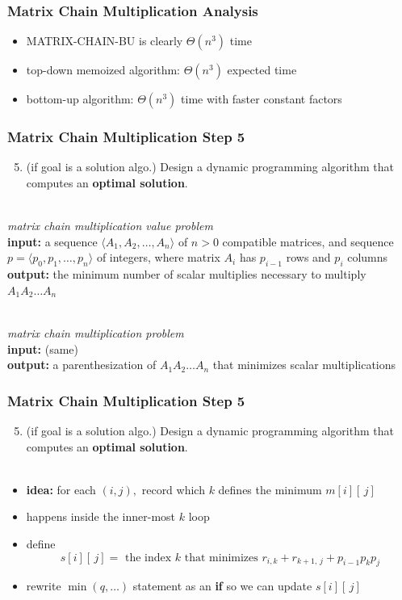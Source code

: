 \documentclass{beamer}
\newcommand{\stanza}{ \\~\ }
\begin{document}
\begin{frame} \frametitle{Matrix Chain Multiplication Analysis}
  \begin{itemize}
    \item MATRIX-CHAIN-BU is clearly $\Theta(n^3)$ time
    \item top-down memoized algorithm: $\Theta(n^3)$ expected time
    \item bottom-up algorithm: $\Theta(n^3)$ time with faster constant factors
  \end{itemize}
\end{frame}

\begin{frame} \frametitle{Matrix Chain Multiplication Step 5}
  \begin{enumerate}
    \setcounter{enumi}{4}
    \item (if goal is a solution algo.) Design a dynamic programming algorithm that computes an \textbf{optimal solution}.
    \stanza
  \end{enumerate}

  \emph{matrix chain multiplication value problem} \\
  \textbf{input:} a sequence $\langle A_1, A_2, \ldots, A_n \rangle$ of $n>0$ compatible matrices,
    and sequence $p=\langle p_0, p_1, \ldots, p_n \rangle$ of integers, where
    matrix $A_i$ has $p_{i-1}$ rows and $p_i$ columns \\
  \textbf{output:} the minimum number of scalar multiplies necessary to multiply $A_1 A_2 \ldots A_n$ 
  \stanza

  \emph{matrix chain multiplication problem} \\
  \textbf{input:} (same) \\
  \textbf{output:} a parenthesization of $A_1 A_2 \ldots A_n$ that minimizes scalar multiplications

\end{frame}

\begin{frame} \frametitle{Matrix Chain Multiplication Step 5}
  \begin{enumerate}
    \setcounter{enumi}{4}
    \item (if goal is a solution algo.) Design a dynamic programming algorithm that computes an \textbf{optimal solution}.
    \stanza
  \end{enumerate}

  \begin{itemize}
    \item \textbf{idea:} for each $(i, j),$ record which $k$ defines the minimum $m[i][\, j]$
    \item happens inside the inner-most $k$ loop
    \item define
      \[ s[i][\, j] = \text{ the index } k \text{ that minimizes } r_{i, k} + r_{k+1, \, j} + p_{i-1} p_k p_j  \]
    \item rewrite $\min(q, \ldots)$ statement as an \textbf{if} so we can update $s[i][\, j]$
  \end{itemize}
\end{frame}
\end{document}

